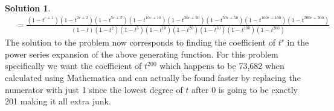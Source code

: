 \documentclass[12pt, letterpaper, onecolumn, conference, final]{IEEEtran}
\theoremstyle{definition}
\newtheorem*{solution*}{Solution}
\theoremstyle{plain}
\begin{document}
\begin{solution*}
\begin{equation*}
\begin{split}
&= \frac{(1-t^{r+1})(1-t^{2r+2})(1-t^{5r+5})(1-t^{10r+10})(1-t^{20r+20})(1-t^{50r+50})(1-t^{100r+100})(1-t^{200r+200})}{(1-t)(1-t^2)(1-t^5)(1-t^{10})(1-t^{20})(1-t^{50})(1-t^{100})(1-t^{200})}
\end{split}
\end{equation*}
The solution to the problem now corresponds to finding the coefficient of $t^r$ in the power series expansion of the above generating function. For this problem specifically we want the coefficient of $t^{200}$ which happens to be 73,682 when calculated using Mathematica and can actually be found faster by replacing the numerator with just 1 since the lowest degree of $t$ after 0 is going to be exactly 201 making it all extra junk.
\end{solution*}
\end{document}
